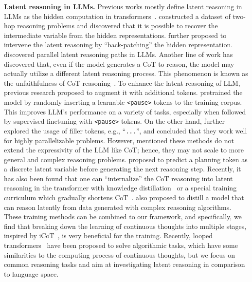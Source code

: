 \documentclass[]{fairmeta}
\begin{document}
\noindent\textbf{Latent reasoning in LLMs.} Previous works mostly define latent reasoning in LLMs as the hidden computation in transformers~\citep{yang2024large, biran2024hopping}. \citet{yang2024large} constructed a dataset of two-hop reasoning problems and discovered that it is possible to recover the intermediate variable from the hidden representations. \citet{biran2024hopping} further proposed to intervene the latent reasoning by ``back-patching'' the hidden representation. \citet{shalev2024distributional} discovered parallel latent reasoning paths in LLMs. Another line of work has discovered that, even if the model generates a CoT to reason, the model may actually utilize a different latent reasoning process. This phenomenon is known as the unfaithfulness of CoT reasoning~\citep{wang2022towards, turpin2024language}. To enhance the latent reasoning of LLM, previous research proposed to augment it with additional tokens. \citet{goyal2023think} pretrained the model by randomly inserting a learnable \texttt{<pause>} tokens to the training corpus. This improves LLM's performance on a variety of tasks, especially when followed by supervised finetuning with \texttt{<pause>} tokens. On the other hand, \citet{pfau2024let} further explored the usage of filler tokens, e.g., ``\texttt{...}'', and concluded that they work well for highly parallelizable problems. However, \citet{pfau2024let} mentioned these methods do not extend the expressivity of the LLM like CoT; hence, they may not scale to more general and complex reasoning problems. %
\citet{wang2023guiding} proposed to predict a planning token as a discrete latent variable before generating the next reasoning step. Recently, it has also been found that one can ``internalize'' the CoT reasoning into latent reasoning in the transformer with knowledge distillation~\citep{deng2023implicit} or a special training curriculum which gradually shortens CoT~\citep{deng2024explicit}. \citet{yu2024distilling} also proposed to distill a model that can reason latently from data generated with complex reasoning algorithms. These training methods can be combined to our framework, and specifically, we find that breaking down the learning of continuous thoughts into multiple stages, inspired by iCoT~\citep{deng2024explicit}, is very beneficial for the training. Recently, looped transformers~\citep{giannou2023looped, fan2024looped} have been proposed to solve algorithmic tasks, which have some similarities to the computing process of continuous thoughts, but we focus on common reasoning tasks and aim at investigating latent reasoning in comparison to language space. 
\end{document}
